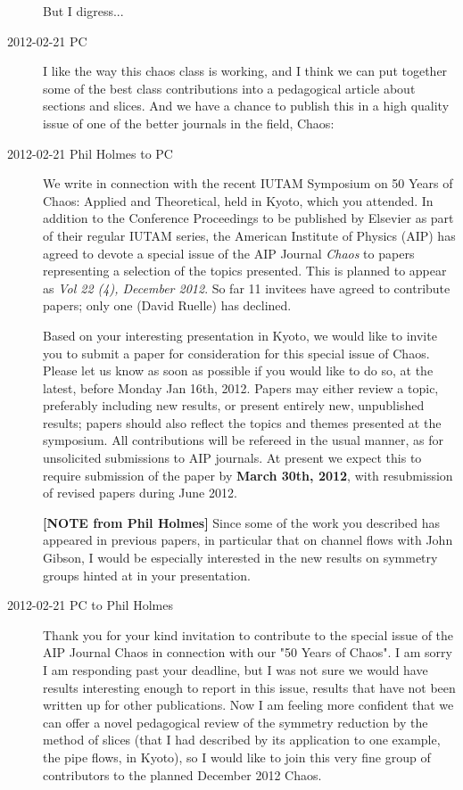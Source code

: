 \begin{description}
But I digress...


\item[2012-02-21 PC]  I like the way this chaos class is working, and I
think we can put together some of the best class contributions into a
pedagogical article about sections and slices. And we have a chance to
publish this in a high quality issue of one of the better journals in the
field, Chaos:

\item[2012-02-21 Phil Holmes to PC]
We write in connection with the recent IUTAM Symposium on 50 Years of
Chaos: Applied and Theoretical, held in Kyoto, which you attended. In
addition to the Conference Proceedings to be published by Elsevier as
part of their regular IUTAM series, the American Institute of Physics
(AIP) has agreed to devote a special issue of the AIP Journal
\emph{Chaos} to papers representing a selection of the topics presented.
This is planned to appear as \emph{Vol 22 (4), December 2012}. So far 11
invitees have agreed to contribute papers; only one (David Ruelle) has
declined.


Based on your interesting presentation in Kyoto, we would like to invite
you to submit a paper for consideration for this special issue of Chaos.
Please let us know as soon as possible if you would like to do so, at the
latest, before Monday Jan 16th, 2012. Papers may either review a topic,
preferably including new results, or present entirely new, unpublished
results; papers should also reflect the topics and themes presented at
the symposium. All contributions will be refereed in the usual manner, as
for unsolicited submissions to AIP journals. At present we expect this to
require submission of the paper by \textbf{March 30th, 2012}, with
resubmission of revised papers during June 2012.


\textbf{[NOTE from Phil Holmes]}
Since some of the work you described has appeared in previous papers, in
particular that on channel flows with John Gibson, I would be especially
interested in the new results on symmetry groups hinted at in your
presentation.


\item[2012-02-21 PC to Phil Holmes]
Thank you for your kind invitation to contribute to the special issue of
the AIP Journal Chaos in connection with our "50 Years of Chaos". I am
sorry I am responding past your deadline, but I was not sure we would
have results interesting enough to report in this issue, results that
have not been written up for other publications. Now I am feeling more
confident that we can offer a novel pedagogical review of the symmetry
reduction by the method of slices (that I had described by its
application to one example, the pipe flows, in Kyoto), so I would like to
join this very fine group of contributors to the planned December 2012
Chaos.


\end{description}
